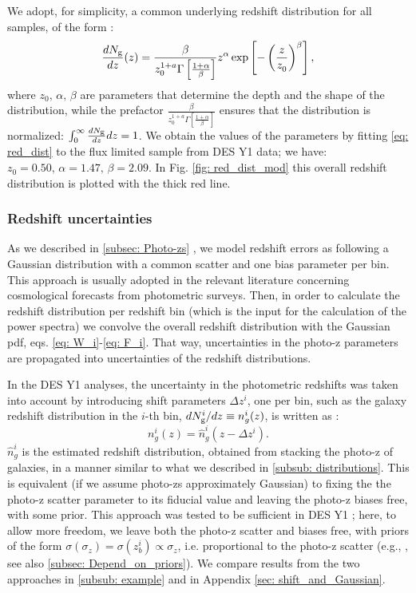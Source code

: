 \documentclass[a4paper,fleqn,usenatbib]{mnras}
\begin{document}
We adopt, for simplicity, a common underlying  redshift distribution for all samples, of the form \citep{Efstathiou1991, Smail1994}:
\begin{equation}
\label{eq: red_dist}
\frac{dN_{\mbox{\scriptsize{g}}}}{dz}(z) = \frac{\beta}{z_0^{1+a}\Gamma\left[ \frac{1+ \alpha}{\beta}\right]}z^\alpha \exp \left[-\left( \frac{z	}{z_{0}^{}}\right)^\beta \right],
\end{equation}
where $z_0, \,\alpha,\, \beta$ are parameters that determine the depth and the shape of the distribution, while the prefactor $ \frac{\beta}{z_0^{1+a}\Gamma\left[ \frac{1+ \alpha}{\beta}\right]}$ ensures that the distribution is normalized: $\int_0^{\infty} \frac{dN_{\mbox{\scriptsize{g}}}}{dz}dz = 1$. We obtain the values of the parameters by fitting \eqref{eq: red_dist} to the flux limited sample from DES Y1 data; we have: $z_0 = 0.50, \, \alpha=1.47, \, \beta = 2.09$. In Fig. \ref{fig: red_dist_mod}  this overall redshift distribution is plotted with the thick red line.

\subsubsection{Redshift uncertainties}

As we described in \ref{subsec: Photo-zs} , we model redshift errors as  following a Gaussian distribution with a common scatter and one bias parameter per bin. This approach is usually adopted in the relevant literature concerning cosmological forecasts from photometric surveys. Then, in order to calculate the redshift distribution per redshift bin (which is the input for the calculation of the power spectra) we convolve the overall redshift distribution with the Gaussian pdf, eqs. \eqref{eq: W_i}-\eqref{eq: F_i}. That way, uncertainties in the photo-z parameters are propagated into uncertainties of the redshift distributions.

In the DES Y1 analyses, the uncertainty in the photometric redshifts was taken into account by introducing shift parameters $\Delta z^i$, one per bin, such as the galaxy redshift distribution in the $i$-th bin,  $dN^i_{\mbox{\scriptsize{g}}}/dz \equiv n_g^i(z) $, is written as \citep{Hoyle2018, Elvin_Poole2018}: 
\begin{equation}
n_g^i(z) = \hat{n}^i_g(z - \Delta z^i)
\label{eq: shifts}.
\end{equation}
$\hat{n}^i_g$ is the estimated redshift distribution, obtained from stacking the photo-z of  galaxies, in a manner similar to what we described in \ref{subsub: distributions}. This is equivalent (if we assume photo-zs approximately Gaussian) to fixing the the photo-z scatter parameter to its fiducial value and leaving the photo-z biases free, with some prior. 
This approach was tested to be sufficient in DES Y1 \citep{Hoyle2018, Elvin_Poole2018}; here, to allow more freedom, we leave both the photo-z scatter and biases free, with priors of the form $\sigma(\sigma_z) = \sigma(z_b^i) \propto \sigma_z$, i.e. proportional to the photo-z scatter (e.g., \citealt{Hearin2010}, see also \ref{subsec: Depend_on_priors}). We compare results from the two approaches in \ref{subsub: example} and in Appendix \ref{sec: shift_and_Gaussian}.
\end{document}
